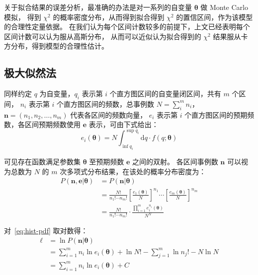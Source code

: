 关于拟合结果的误差分析，最准确的办法是对一系列的自变量 $\boldsymbol{\theta}$ 做 Monte Carlo 模拟，
得到 $\chi^2$ 的概率密度分布，从而得到拟合得到 $\chi^2$ 的置信区间，作为该模型的合理性定量依据。
在我们认为每个区间计数较多的前提下，上文已经表明每个区间计数可以认为服从高斯分布，
从而可以近似认为拟合得到的 $\chi^2$ 结果服从卡方分布，得到模型的合理性估计。

\subsection{极大似然法}

同样约定 $q$ 为自变量，$q_i$ 表示第 $i$ 个直方图区间的自变量闭区间，共有 $m$ 个区间，
$n_i$ 表示第 $i$ 个直方图区间的频数，总事例数 $N=\sum_{i}^{m}n_i$，$\boldsymbol{n}=(n_1, n_2, \ldots, n_m)$ 代表各区间的频数向量，
$e_i$ 表示第 $i$ 个直方图区间的预期频数，各区间预期频数使用 $\boldsymbol{e}$ 表示，可由下式给出：
\begin{equation}
    e_i(\boldsymbol{\theta}) = N\int_{\inf q_i}^{\sup q_i}\mathrm{d}q\cdot f(q;\boldsymbol{\theta})
    \label{eq:ei}
\end{equation}

可见存在函数满足参数集 $\boldsymbol{\theta}$ 至预期频数 $\boldsymbol{e}$ 之间的双射。
各区间事例数 $\boldsymbol{n}$ 可以视为总数为 $N$ 的 $m$ 次多项式分布结果，在该处的概率分布密度为：
\begin{equation}
    \begin{aligned}
        P(\boldsymbol{n},\boldsymbol{e}|\boldsymbol{\theta})
        &=P(\boldsymbol{n}|\boldsymbol{\theta})\\
        &=\frac{N!}{n_1!\cdots n_m!}\left[\frac{e_1(\boldsymbol{\theta})}{N}\right]^{n_1}
        \cdots\left[\frac{e_m(\boldsymbol{\theta})}{N}\right]^{n_m}\\
        &=\frac{N!}{n_1!\cdots n_m!}\cdot\frac{\prod_{i=1}^{m}e_i^{n_i}(\boldsymbol{\theta})}{N^N}
    \end{aligned}
    \label{eq:hist-pdf}
\end{equation}

对~\eqref{eq:hist-pdf} 取对数得：
\begin{equation}
    \begin{aligned}
        \ell&=\ln P(\boldsymbol{n}|\boldsymbol{\theta})\\
        &=\sum_{i=1}^{m}n_i\ln{e_i(\boldsymbol{\theta})}
        +\ln{N!}-\sum_{j=1}^{m}\ln{n_j!}-N\ln{N}\\
        &=\sum_{i=1}^{m}n_i\ln{e_i(\boldsymbol{\theta})}+C
    \end{aligned}
    \label{eq:log-l}
\end{equation}

